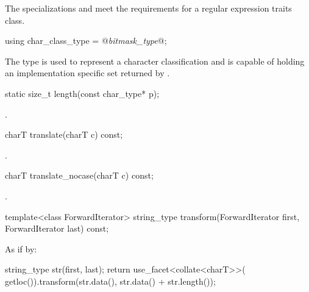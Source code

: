 \pnum
{}%
%
%
The specializations  and
 meet the
requirements for a regular expression traits class.

%
\begin{itemdecl}
using char_class_type = @\textit{bitmask_type}@;
\end{itemdecl}

\begin{itemdescr}
\pnum
The type  is used to represent a character
classification and is capable of holding an implementation specific
set returned by .
\end{itemdescr}

%
\begin{itemdecl}
static size_t length(const char_type* p);
\end{itemdecl}

\begin{itemdescr}
\pnum
\returns
{}.
\end{itemdescr}

%
\begin{itemdecl}
charT translate(charT c) const;
\end{itemdecl}

\begin{itemdescr}
\pnum
\returns
{}.
\end{itemdescr}

%
\begin{itemdecl}
charT translate_nocase(charT c) const;
\end{itemdecl}

\begin{itemdescr}
\pnum
\returns
{}.
\end{itemdescr}

%
\begin{itemdecl}
template<class ForwardIterator>
  string_type transform(ForwardIterator first, ForwardIterator last) const;
\end{itemdecl}

\begin{itemdescr}
\pnum
\effects
As if by:
\begin{codeblock}
string_type str(first, last);
return use_facet<collate<charT>>(
  getloc()).transform(str.data(), str.data() + str.length());
\end{codeblock}
\end{itemdescr}


